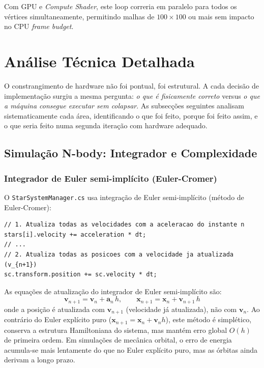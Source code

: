 \documentclass[12pt,a4paper]{article}
\begin{document}
Com GPU e \textit{Compute Shader}, este loop correria em paralelo para todos os v\'{e}rtices simultaneamente, permitindo malhas de $100 \times 100$ ou mais sem impacto no CPU \textit{frame budget}.

\section{An\'{a}lise T\'{e}cnica Detalhada}

O constrangimento de hardware n\~{a}o foi pontual, foi estrutural. A cada decis\~{a}o de implementa\c{c}\~{a}o surgiu a mesma pergunta: \textit{o que \'{e} fisicamente correto} versus \textit{o que a m\'{a}quina consegue executar sem colapsar}. As subsec\c{c}\~{o}es seguintes analisam sistematicamente cada \'{a}rea, identificando o que foi feito, porque foi feito assim, e o que seria feito numa segunda itera\c{c}\~{a}o com hardware adequado.

\subsection{Simula\c{c}\~{a}o N-body: Integrador e Complexidade}

\subsubsection{Integrador de Euler semi-impl\'icito (Euler-Cromer)}

O \texttt{StarSystemManager.cs} usa integra\c{c}\~{a}o de Euler semi-impl\'{i}cito (m\'{e}todo de Euler-Cromer):

\begin{lstlisting}[caption={StarSystemManager.cs - Euler semi-impl\'{i}cito no FixedUpdate}]
// 1. Atualiza todas as velocidades com a aceleracao do instante n
stars[i].velocity += acceleration * dt;
// ...
// 2. Atualiza todas as posicoes com a velocidade ja atualizada (v_{n+1})
sc.transform.position += sc.velocity * dt;
\end{lstlisting}

As equa\c{c}\~{o}es de atualiza\c{c}\~{a}o do integrador de Euler semi-impl\'{i}cito s\~{a}o:
\begin{equation}
\mathbf{v}_{n+1} = \mathbf{v}_n + \mathbf{a}_n \, h, \qquad
\mathbf{x}_{n+1} = \mathbf{x}_n + \mathbf{v}_{n+1} \, h
\end{equation}
onde a posi\c{c}\~{a}o \'{e} atualizada com $\mathbf{v}_{n+1}$ (velocidade j\'{a} atualizada), n\~{a}o com $\mathbf{v}_n$. Ao contr\'{a}rio do Euler expl\'{i}cito puro ($\mathbf{x}_{n+1} = \mathbf{x}_n + \mathbf{v}_n h$), este m\'{e}todo \'{e} simpl\'{e}tico, conserva a estrutura Hamiltoniana do sistema, mas mant\'{e}m erro global $O(h)$ de primeira ordem. Em simula\c{c}\~{o}es de mec\^{a}nica orbital, o erro de energia acumula-se mais lentamente do que no Euler expl\'{i}cito puro, mas as \'{o}rbitas ainda derivam a longo prazo.
\end{document}
